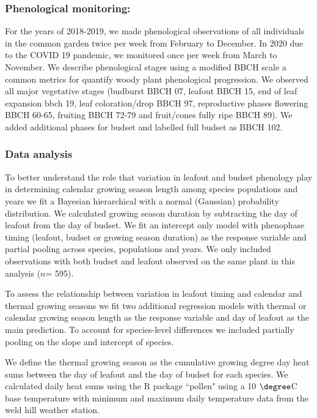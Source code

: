 \documentclass{article}[12pt]
\begin{document}
\subsubsection{Phenological monitoring:}
For the years of 2018-2019, we made phenological observations of all individuals in the common garden twice per week from February to December. In 2020 due to the COVID 19 pandemic, we monitored once per week from March to November. We describe phenological stages using a modified BBCH scale \citep{Finn2007} a common metrics for quantify woody plant phenological progression. We observed all major vegetative stages (budburst BBCH 07, leafout BBCH 15, end of leaf expansion bbch 19, leaf coloration/drop BBCH 97, reproductive phases flowering BBCH 60-65, fruiting BBCH 72-79 and fruit/cones fully ripe BBCH 89). We added additional phases for budset and labelled full budset as BBCH 102. 

\subsubsection{Data analysis}
To better understand the role that variation in leafout and budset phenology play in determining calendar growing season length among species populations and years we fit a Bayesian hierarchical with a normal (Gaussian) probability distribution. We calculated growing season duration by subtracting the day of leafout from the day of budset. We fit an intercept only model with phenophase timing (leafout, budset or growing season duration) as the response variable and partial pooling across species, populations and years. We only included observations with both budset and leafout observed on the same plant in this analysis ($n$= 595).

To assess the relationship between variation in leafout timing and calendar and thermal growing seasons we fit two additional regression models with thermal or calendar growing season length as the response variable and day of leafout as the main prediction. To account for species-level differences we included partially pooling on the slope and intercept of species.

We define the thermal growing season as the cumulative growing degree day heat sums between the day of leafout and the day of budset for each species. We calculated daily heat sums using the R package ``pollen" \citep{Nowosad2019} using a 10 $\degree$C base temperature with minimum and maximum daily temperature data from the weld hill weather station.
\end{document}
